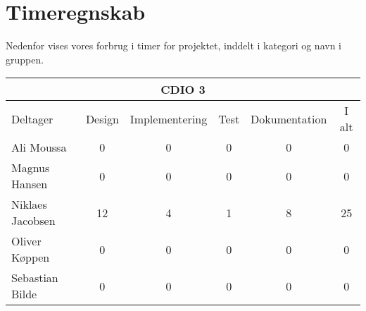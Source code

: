 \chapter{Timeregnskab}

Nedenfor vises vores forbrug i timer for projektet, inddelt i kategori og navn i gruppen.

\begin{table}[h]
    \centering
        \begin{tabular}{|l|c|c|c|c|c|}
                \hline
            \multicolumn{6}{|c|}{CDIO 3}

                \\ \hline
                                Deltager            &       Design      &      Implementering    &      Test     &       Dokumentation        &       I alt
                \\ \hline

                                Ali Moussa          &         0        &             0           &        0      &             0              &          0
                \\ \hline

                                Magnus Hansen       &         0        &             0           &        0      &             0              &          0
                \\ \hline

                                Niklaes Jacobsen    &         12       &             4           &        1      &             8              &          25
                \\ \hline

                                Oliver Køppen       &         0        &             0           &        0      &             0              &          0
                \\ \hline

                                Sebastian Bilde     &         0        &             0           &        0      &             0              &          0
                \\ \hline

        \end{tabular}
\end{table}